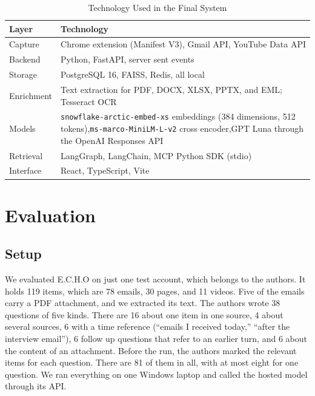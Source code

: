 \documentclass[conference]{IEEEtran}
\newcommand{\embmodel}{\texttt{snowflake\allowbreak-arctic\allowbreak-embed\allowbreak-xs}}
\newcommand{\embdim}{384}
\newcommand{\rerankmodel}{\texttt{ms\allowbreak-marco\allowbreak-MiniLM\allowbreak-L\allowbreak-6\allowbreak-v2}}
\newcommand{\llmname}{GPT\nobreakdash-6 Luna}
\begin{document}
\begin{table}[t]
\caption{Technology Used in the Final System}
\label{tab:stack}
\centering
\renewcommand{\arraystretch}{1.15}
\begin{tabular}{|>{\raggedright\arraybackslash}p{2.0cm}|>{\raggedright\arraybackslash}p{5.55cm}|}
\hline
\textbf{Layer} & \textbf{Technology} \\
\hline
Capture & Chrome extension (Manifest V3), Gmail API, YouTube Data API \\
\hline
Backend & Python, FastAPI, server sent events \\
\hline
Storage & PostgreSQL 16, FAISS, Redis, all local \\
\hline
Enrichment & Text extraction for PDF, DOCX, XLSX, PPTX, and EML; Tesseract OCR \\
\hline
Models & \embmodel{} embeddings (\embdim{} dimensions, 512 tokens),\newline \rerankmodel{} cross encoder,\newline \llmname{} through the OpenAI Responses API \\
\hline
Retrieval & LangGraph, LangChain, MCP Python SDK (stdio) \\
\hline
Interface & React, TypeScript, Vite \\
\hline
\end{tabular}
\end{table}

\section{Evaluation}\label{sec:eval}
\subsection{Setup}
We evaluated E.C.H.O on just one test account, which belongs to the authors. It holds 119 items, which are 78 emails, 30 pages, and 11 videos. Five of the emails carry a PDF attachment, and we extracted its text. The authors wrote 38 questions of five kinds. There are 16 about one item in one source, 4 about several sources, 6 with a time reference (``emails I received today,'' ``after the interview email''), 6 follow up questions that refer to an earlier turn, and 6 about the content of an attachment. Before the run, the authors marked the relevant items for each question. There are 81 of them in all, with at most eight for one question. We ran everything on one Windows laptop and called the hosted model through its API.
\end{document}
